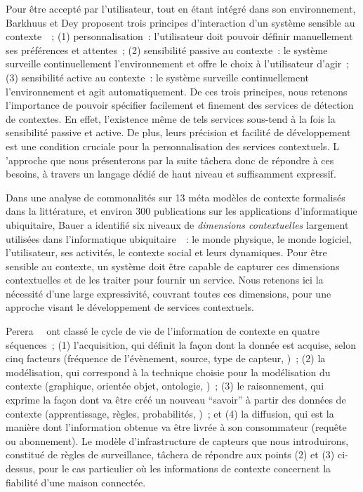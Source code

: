 Pour être accepté par l'utilisateur, tout en étant intégré dans son
environnement, Barkhuus et Dey proposent trois principes
d'interaction d'un système sensible au contexte~\parencite{barkhuus2003is}~; (1) personnalisation~:
l'utilisateur doit pouvoir définir manuellement ses préférences et
attentes~; (2) sensibilité passive au contexte~: le système surveille
continuellement l'environnement et offre le choix à l'utilisateur
d'agir~; (3) sensibilité active au contexte~: le système surveille
continuellement l'environnement et agit automatiquement.
De ces trois principes, nous retenons l'importance de pouvoir
spécifier facilement et finement des services de détection de
contextes. En effet, l'existence même de tels services sous-tend à la
fois la sensibilité passive et active.  De plus, leurs précision et
facilité de développement est une condition cruciale pour la
personnalisation des services contextuels. L 'approche que nous présenterons
par la suite tâchera donc de
répondre à ces besoins, à travers un langage dédié de haut niveau et
suffisamment expressif.

Dans une analyse de commonalités sur 13 méta modèles de contexte formalisés dans la
littérature, et environ 300 publications sur les applications d'informatique 
ubiquitaire, Bauer a identifié six niveaux de 
{\em dimensions contextuelles} largement utilisées dans l'informatique 
ubiquitaire~\parencite{bauer2012comparison}~: le monde physique, le monde logiciel, l'utilisateur, ses activités, 
le contexte social et leurs dynamiques. 
Pour être sensible au contexte, un système doit être capable de capturer ces dimensions contextuelles et de les traiter pour fournir un service.
Nous retenons ici la nécessité d'une large expressivité, couvrant toutes ces dimensions, pour une approche visant le développement
de services contextuels.

Perera~\etal~\parencite{perera2014context} ont classé le cycle de vie de l'information de contexte en quatre séquences~;
(1) l'acquisition, qui définit la façon dont la donnée est acquise, selon cinq facteurs (\eg fréquence de l'évènement, source, type de capteur, \etc)~;
(2) la modélisation, qui correspond à la technique choisie pour la modélisation du contexte (\eg graphique, orientée objet, ontologie, \etc)~;
(3) le raisonnement, qui exprime la façon dont va être créé un nouveau ``savoir'' à partir des données de contexte (\eg apprentissage, règles, probabilités, \etc)~;
et (4) la diffusion, qui est la manière dont l'information obtenue va être livrée à son consommateur (\eg requête ou abonnement).
Le modèle d'infrastructure de capteurs que nous introduirons, constitué de règles de surveillance, tâchera de répondre aux points (2) et (3) ci-dessus, pour le cas particulier où les informations de contexte concernent la fiabilité d'une maison connectée.

